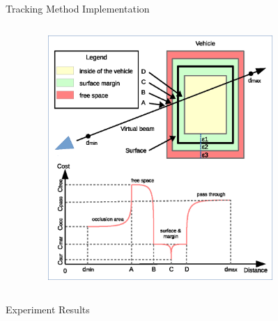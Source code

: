 \documentclass[final,hyperref={pdfpagelabels=false}]{beamer}
\begin{document}
\begin{frame}[t]
\begin{columns}[t]
\begin{column}{.48\textwidth}
\begin{block}{Tracking Method Implementation}
\begin{columns}[t]
\begin{column}{0.53\textwidth}
\begin{itemize}
		\end{itemize}
	\end{column}
	\begin{column}{0.43\textwidth}
		\begin{figure}
		 \centering
		 \includegraphics[width=0.8\textwidth]{./img/measure.eps}
		\end{figure}
	\end{column}
\end{columns}
\end{block}



\begin{block}{Experiment Results}


\end{block}
\end{column}
\end{columns}
\end{frame}
\end{document}
